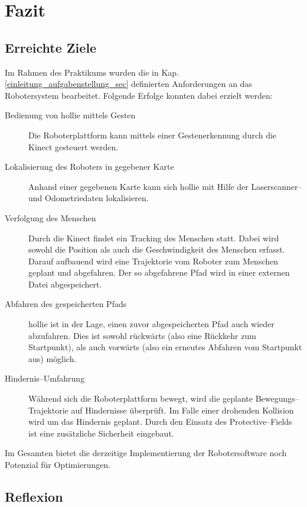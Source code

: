 
\chapter{Fazit}

\section{Erreichte Ziele}
\authorsection{\editorjulian, \editortobias}

Im Rahmen des Praktikums wurden die in Kap. \ref{einleitung_aufgabenstellung_sec} definierten Anforderungen an das Robotersystem bearbeitet.
Folgende Erfolge konnten dabei erzielt werden:

\begin{description}
  \item [Bedienung von \gls{hollie} mittels Gesten]
  		Die Roboterplattform kann mittels einer Gestenerkennung durch die Kinect gesteuert werden.
  \item [Lokalisierung des Roboters in gegebener Karte]
  		Anhand einer gegebenen Karte kann sich \gls{hollie} mit Hilfe der Laserscanner-- und Odometriedaten lokalisieren.
  \item [Verfolgung des Menschen]
			Durch die Kinect findet ein Tracking des Menschen statt.
			Dabei wird sowohl die Position als auch die Geschwindigkeit des Menschen erfasst.
			Darauf aufbauend wird eine Trajektorie vom Roboter zum Menschen geplant und abgefahren.
			Der so abgefahrene Pfad wird in einer externen Datei abgespeichert. 
  \item [Abfahren des gespeicherten Pfads]
			\gls{hollie} ist in der Lage, einen zuvor abgespeicherten Pfad auch wieder abzufahren.
			Dies ist sowohl rückwärts (also eine Rückkehr zum Startpunkt), als auch vorwärts (also ein erneutes Abfahren vom Startpunkt aus) möglich.
  \item [Hindernis--Umfahrung]
			Während sich die Roboterplattform bewegt, wird die geplante Bewegungs--Trajektorie auf Hindernisse überprüft.
			Im Falle einer drohenden Kollision wird um das Hindernis geplant.
			Durch den Einsatz des Protective--Fields ist eine zusätzliche Sicherheit eingebaut.
\end{description}

Im Gesamten bietet die derzeitige Implementierung der Robotersoftware noch Potenzial für Optimierungen.

\section{Reflexion}
\authorsection{\editorandreas}
